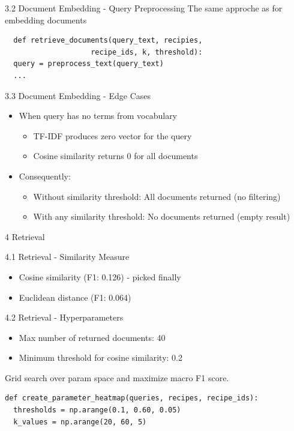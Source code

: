 \documentclass{beamer}
\begin{document}
\begin{frame}[fragile]{3.2 Document Embedding - Query Preprocessing}
  The same approche as for embedding documents
  \begin{verbatim}
  def retrieve_documents(query_text, recipies,
                    recipe_ids, k, threshold):
  query = preprocess_text(query_text)
  ...
    \end{verbatim}
\end{frame}

\begin{frame}{3.3 Document Embedding - Edge Cases}
  \begin{itemize}
    \item When query has no terms from vocabulary
          \begin{itemize}
            \item TF-IDF produces zero vector for the query
            \item Cosine similarity returns 0 for all documents
          \end{itemize}
    \item Consequently:
          \begin{itemize}
            \item Without similarity threshold: All documents returned (no filtering)
            \item With any similarity threshold: No documents returned (empty result)
          \end{itemize}
  \end{itemize}
\end{frame}

\begin{frame}{4 Retrieval}
\end{frame}

\begin{frame}{4.1 Retrieval - Similarity Measure}
  \begin{itemize}
    \item Cosine similarity (F1: 0.126) - picked finally
    \item Euclidean distance (F1: 0.064)
  \end{itemize}
\end{frame}

\begin{frame}[fragile]{4.2 Retrieval - Hyperparameters}
  \begin{itemize}
    \item Max number of returned documents: 40
    \item Minimum threshold for cosine similarity: 0.2
  \end{itemize}
  Grid search over param space and maximize macro F1 score.

  \begin{verbatim}
def create_parameter_heatmap(queries, recipes, recipe_ids):
  thresholds = np.arange(0.1, 0.60, 0.05)
  k_values = np.arange(20, 60, 5)
  \end{verbatim}

\end{frame}
\end{document}
